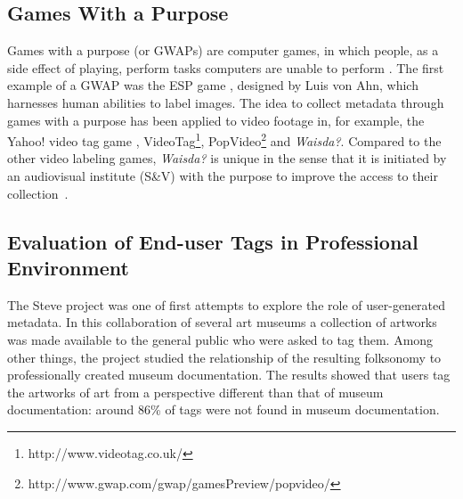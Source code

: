 \subsection{Games With a Purpose}
Games with a purpose (or GWAPs) are computer games, in which people, as a side effect of playing, perform tasks computers are unable to perform \cite{gwap}. The first example of a GWAP was the ESP game \cite{CHI2004:vonAhn}, designed by Luis von Ahn, which harnesses human abilities to label images. %
The idea to collect metadata through games with a purpose has been applied to video footage in, for example, the Yahoo! video tag game \cite{WWW08_vanZwol_etal},
VideoTag\footnote{http://www.videotag.co.uk/}, PopVideo\footnote{http://www.gwap.com/gwap/gamesPreview/popvideo/} and \emph{Waisda?}. Compared to the other video labeling games, \emph{Waisda?} is unique in the sense that it is initiated by an audiovisual institute (S\&V) with the purpose to improve the access to their collection~\cite{johanwebsci}.

\subsection{Evaluation of End-user Tags in Professional Environment}
The Steve project \cite{MATW2009:Leason} was one of first attempts to explore the role of user-generated metadata. In this collaboration of several art museums a collection of artworks was made available to the general public who were asked to tag them. Among other things, the project studied the relationship of the resulting folksonomy to professionally created museum documentation. The results showed that users tag the artworks of art from a perspective different than that of museum documentation: around 86\% of tags were not found in museum documentation.

